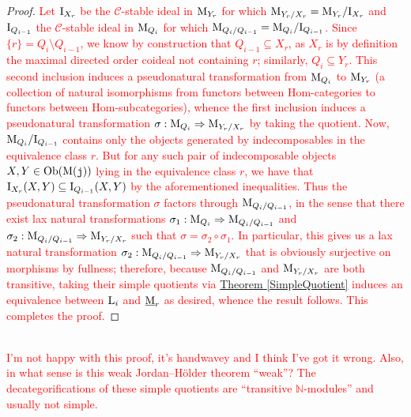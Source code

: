 \begin{proof}
\noindent \textcolor{red}{Let $\textup{I}_{X_r}$ be the $\mathscr{C}$-stable ideal in $\textup{M}_{Y_r}$ for which $\textup{M}_{Y_r/X_r} = \textup{M}_{Y_r}/\textup{I}_{X_r}$ and $\textup{I}_{Q_{i-1}}$ the $\mathscr{C}$-stable ideal in $\textup{M}_{Q_i}$ for which $\textup{M}_{Q_i/Q_{i-1}} = \textup{M}_{Q_i}/\textup{I}_{Q_{i-1}}$. Since $\{r\} = Q_i\setminus Q_{i-1}$, we know by construction that $Q_{i-1} \subseteq X_r$, as $X_r$ is by definition the maximal directed order coideal not containing $r$; similarly, $Q_i \subseteq Y_r$. This second inclusion induces a pseudonatural transformation from $\textup{M}_{Q_i}$ to $\textup{M}_{Y_r}$ (a collection of natural isomorphisms from functors between Hom-categories to functors between Hom-subcategories), whence the first inclusion induces a pseudonatural transformation $\sigma : \textup{M}_{Q_i} \Rightarrow \textup{M}_{Y_r/X_r}$ by taking the quotient. Now, $\textup{M}_{Q_i}/\textup{I}_{Q_{i-1}}$ contains only the objects generated by indecomposables in the equivalence class $r$. But for any such pair of indecomposable objects $X, Y \in \textnormal{Ob}(\textup{M}(\textnormal{\texttt{j}}))$ lying in the equivalence class $r$, we have that $\textup{I}_{X_r}(X, Y) \subseteq \textup{I}_{Q_{i-1}}(X, Y)$ by the aforementioned inequalities. Thus the pseudonatural transformation $\sigma$ factors through $\textup{M}_{Q_i/Q_{i-1}}$, in the sense that there exist lax natural transformations $\sigma_1 : \textup{M}_{Q_i} \Rightarrow \textup{M}_{Q_i/Q_{i-1}}$ and $\sigma_2 : \textup{M}_{Q_i/Q_{i-1}} \Rightarrow \textup{M}_{Y_r/X_r}$ such that $\sigma = \sigma_2 \circ \sigma_1$. In particular, this gives us a lax natural transformation $\sigma_2 : \textup{M}_{Q_i/Q_{i-1}} \Rightarrow \textup{M}_{Y_r/X_r}$ that is obviously surjective on morphisms by fullness; therefore, because $\textup{M}_{Q_i/Q_{i-1}}$ and $\textup{M}_{Y_r/X_r}$ are both transitive, taking their simple quotients via \hyperref[SimpleQuotient]{Theorem \ref*{SimpleQuotient}} induces an equivalence between $\textup{L}_i$ and $\underline{\textup{M}}_r$ as desired, whence the result follows. This completes the proof.}
\end{proof}\\

\noindent\textcolor{red}{I'm not happy with this proof, it's handwavey and I think I've got it wrong. Also, in what sense is this weak Jordan--H\"{o}lder theorem ``weak''? The decategorifications of these simple quotients are ``transitive $\mathbb{N}$-modules'' and usually not simple.}\\
\newpage


